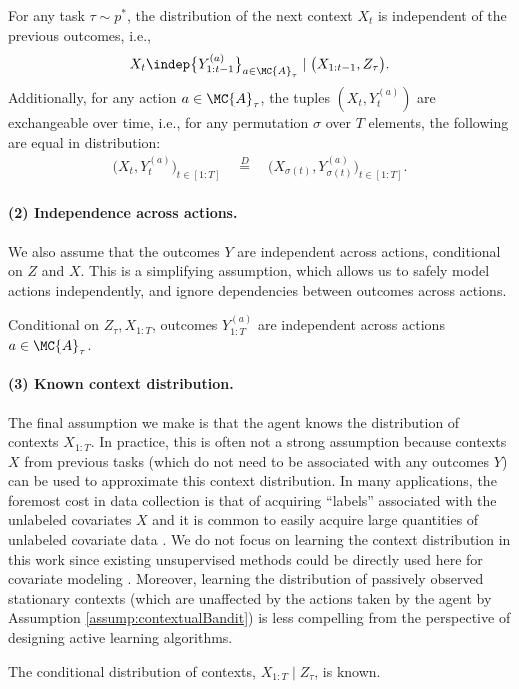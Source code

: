 \begin{assumption}
\label{assump:contextualBandit}
For any task $\tau \sim p^*$, the distribution of the next context $X_t$ is independent of the previous outcomes, i.e., 
\begin{align*}
     X_t \indep \big\{ Y_{1:t-1}^{(a)} \big\}_{a \in \MC{A}_{\tau}} \mid \big( X_{1:t-1}, Z_{\tau} \big). 
\end{align*}
Additionally, for any action $a \in \MC{A}_{\tau}$, the tuples $(X_t, Y_t^{(a)})$ are exchangeable over time, i.e., for any permutation $\sigma$ over $T$ elements, the following are equal in distribution: 
\begin{align*}
    \big( X_t, Y_t^{(a)} \big)_{t \in [1 \colon T]} 
    \quad \overset{D}{=} \quad
    \big( X_{\sigma(t)}, Y_{\sigma(t)}^{(a)} \big)_{t \in [1 \colon T]}.
\end{align*}
\end{assumption}

\paragraph{(2) Independence across actions.} 
We also assume that the outcomes $Y$ are independent across actions, conditional on $Z$ and $X$. This is a simplifying assumption, which allows us to safely model actions independently, and ignore dependencies between outcomes across actions.
\begin{assumption}
    Conditional on $Z_{\tau}, X_{1:T}$, outcomes $Y_{1:T}^{(a)}$ are independent across actions $a \in \MC{A}_{\tau}$.
    \label{assump:indepAction}
\end{assumption}

\paragraph{(3) Known context distribution.}
The final assumption we make is that the agent knows the distribution of contexts $X_{1:T}$. In practice, this is often not a strong assumption because contexts $X$ from previous tasks (which do not need to be associated with any outcomes $Y$) can be used to approximate this context distribution. In many applications, the foremost cost in data collection is that of acquiring ``labels'' associated with the unlabeled covariates $X$ \citep{settles2009active} and it is common to easily acquire large quantities of unlabeled covariate data \citep{zhou2021semi}. We do not focus on learning the context distribution in this work since existing unsupervised methods could be directly used here for covariate modeling \citep{jonsson1998automated}. Moreover, learning the distribution of passively observed stationary contexts (which are unaffected by the actions taken by the agent by Assumption \ref{assump:contextualBandit}) is less compelling from the perspective of designing active learning algorithms. 
\begin{assumption}
    The conditional distribution of contexts, $X_{1:T} \mid Z_{\tau}$, is known.\label{assump:context}
\end{assumption}


